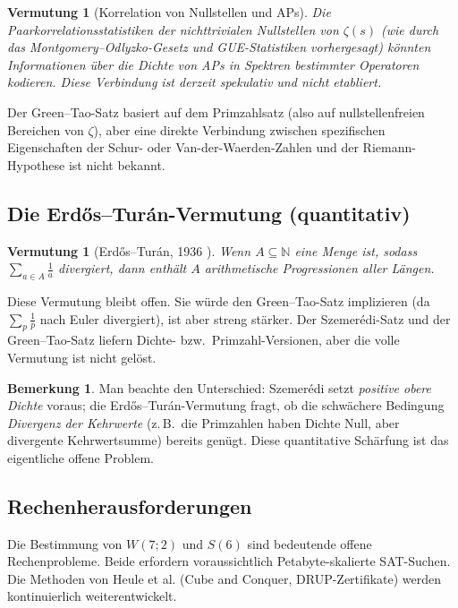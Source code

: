 \documentclass[12pt,a4paper]{amsart}
\newtheorem{conjecture}[theorem]{Vermutung}
\theoremstyle{definition}
\newtheorem{remark}[theorem]{Bemerkung}
\newcommand{\N}{\mathbb{N}}
\begin{document}
\begin{conjecture}[Korrelation von Nullstellen und APs]\label{verm:rh-ap}
Die Paarkorrela\-tionsstatistiken der nichttrivialen Nullstellen von $\zeta(s)$
(wie durch das Montgomery--Odlyzko-Gesetz und GUE-Statistiken vorhergesagt) könnten
Informationen über die Dichte von APs in Spektren bestimmter Operatoren kodieren.
Diese Verbindung ist derzeit spekulativ und nicht etabliert.
\end{conjecture}

Der Green--Tao-Satz basiert auf dem Primzahlsatz (also auf nullstellenfreien Bereichen
von $\zeta$), aber eine direkte Verbindung zwischen spezifischen Eigenschaften der
Schur- oder Van-der-Waerden-Zahlen und der Riemann-Hypothese ist nicht bekannt.

\subsection{Die Erdős--Turán-Vermutung (quantitativ)}

\begin{conjecture}[Erdős--Turán, 1936 \cite{ErdosTuran1936}]
Wenn $A \subseteq \N$ eine Menge ist, sodass $\sum_{a \in A} \frac{1}{a}$ divergiert,
dann enthält $A$ arithmetische Progressionen aller Längen.
\end{conjecture}

Diese Vermutung bleibt offen. Sie würde den Green--Tao-Satz implizieren (da
$\sum_{p} \frac{1}{p}$ nach Euler divergiert), ist aber streng stärker. Der
Szemerédi-Satz und der Green--Tao-Satz liefern Dichte- bzw.\ Primzahl-Versionen,
aber die volle Vermutung ist nicht gelöst.

\begin{remark}
Man beachte den Unterschied: Szemerédi setzt \emph{positive obere Dichte} voraus;
die Erdős--Turán-Vermutung fragt, ob die schwächere Bedingung \emph{Divergenz der
Kehrwerte} (z.\,B.\ die Primzahlen haben Dichte Null, aber divergente Kehrwertsumme)
bereits genügt. Diese quantitative Schärfung ist das eigentliche offene Problem.
\end{remark}

\subsection{Rechenherausforderungen}

Die Bestimmung von $W(7;2)$ und $S(6)$ sind bedeutende offene Rechenprobleme. Beide
erfordern voraussichtlich Petabyte-skalierte SAT-Suchen. Die Methoden von Heule et al.
(Cube and Conquer, DRUP-Zertifikate) werden kontinuierlich weiterentwickelt.
\end{document}

